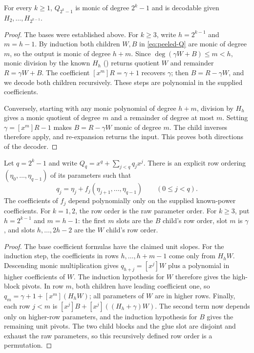 \begin{lemma}
\label{lem:peeled-Q-decodable}
For every $k\ge1$, $Q_{2^k-1}$ is monic of degree $2^k-1$ and is decodable
given $H_2,\ldots,H_{2^{k-1}}$.
\end{lemma}
\begin{proof}
The bases were established above.  For $k\ge3$, write $h=2^{k-1}$ and
$m=h-1$.  By induction both children $W,B$ in \eqref{eq:peeled-Q} are
monic of degree $m$, so the output is monic of degree $h+m$.
Since $\deg(\gamma W+B)\le m<h$, monic division by the known $H_h$
() returns quotient $W$ and remainder
$R=\gamma W+B$.  The coefficient $[x^m]R=\gamma+1$ recovers $\gamma$;
then $B=R-\gamma W$, and we decode both children recursively.
These steps are polynomial in the supplied coefficients.

Conversely, starting with any monic polynomial of degree $h+m$, division
by $H_h$ gives a monic quotient of degree $m$ and a remainder of degree
at most $m$.  Setting $\gamma=[x^m]R-1$ makes $B=R-\gamma W$ monic of
degree $m$.  The child inverses therefore apply, and re-expansion returns
the input.  This proves both directions of the decoder.
\end{proof}

\begin{lemma}
\label{lem:Q-unitriangular}
Let $q=2^k-1$ and write $Q_q=x^q+\sum_{j<q}q_jx^j$.
There is an explicit row ordering $(\eta_0,\ldots,\eta_{q-1})$ of its
parameters such that
\[
  q_j=\eta_j+f_j(\eta_{j+1},\ldots,\eta_{q-1})
  \qquad(0\le j<q).
  \tag{Q-tri}
\]
The coefficients of $f_j$ depend polynomially only on the supplied
known-power coefficients.  For $k=1,2$, the row order is the raw
parameter order.  For $k\ge3$, put $h=2^{k-1}$ and $m=h-1$:
the first $m$ slots are the $B$ child's row order, slot $m$ is $\gamma$,
and slots $h,\ldots,2h-2$ are the $W$ child's row order.
\end{lemma}
\begin{proof}
The base coefficient formulas have the claimed unit slopes.
For the induction step, the coefficients in rows $h,\ldots,h+m-1$
come only from $H_hW$.  Descending monic multiplication gives
$q_{h+j}=[x^j]W$ plus a polynomial in higher coefficients of $W$.
The induction hypothesis for $W$ therefore gives the high-block pivots.
In row $m$, both children have leading coefficient one, so
$q_m=\gamma+1+[x^m](H_hW)$; all parameters of $W$ are in higher rows.
Finally, each row $j<m$ is $[x^j]B+[x^j]((H_h+\gamma)W)$.
The second term now depends only on higher-row parameters, and the
induction hypothesis for $B$ gives the remaining unit pivots.
The two child blocks and the glue slot are disjoint and exhaust the raw
parameters, so this recursively defined row order is a permutation.
\end{proof}

